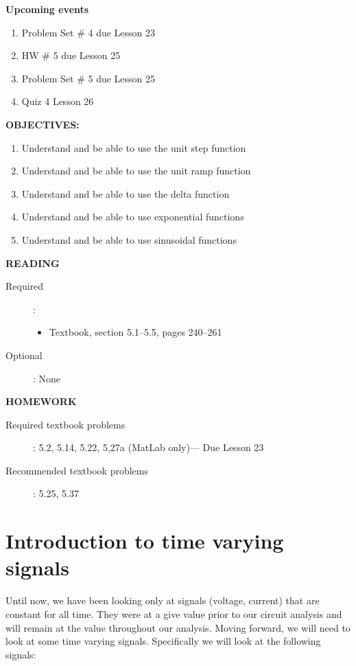 \documentclass{handout}
\begin{document}
\maketitle

\textbf{Upcoming events}
\begin{enumerate}
\item Problem Set \# 4 due Lesson 23
\item HW \# 5 due Lesson 25
\item Problem Set \# 5 due Lesson 25
\item Quiz 4 Lesson 26
\end{enumerate}

\textbf{OBJECTIVES:}
\begin{enumerate}
\item Understand and be able to use the unit step function
\item Understand and be able to use the unit ramp function
\item Understand and be able to use the delta function
\item Understand and be able to use  exponential functions
\item Understand and be able to use sinusoidal functions
\end{enumerate}

\textbf{READING}
\begin{description}
\item [Required]:
\begin{itemize}
\item  Textbook, section 5.1--5.5, pages 240--261
\end{itemize}
\item [Optional]: None
\end{description}

\textbf{HOMEWORK}
\begin{description}
\item [Required textbook problems]: 5.2, 5.14, 5.22, 5,27a (MatLab only)--- Due Lesson 23
\item [Recommended textbook problems]: 5.25, 5.37
\end{description}

\section{Introduction to time varying signals}
Until now, we have been looking only at signals (voltage, current) that are constant for all time.  They were at a give value prior to our circuit analysis and will remain at the value throughout our analysis.  Moving forward, we will need to look at some time varying signals.  Specifically we will look at the following signals:
\end{document}
